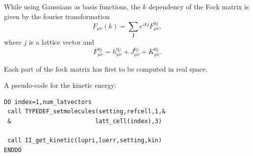 \documentclass[12pt,a4paper,english]{beamer}
\newcommand{\mbf}{ \mathbf }
\newcommand{\braopket}[3]{\langle #1|#2|#3\rangle}
\begin{document}
\begin{frame}

  While using Gaussians as basis functions, the $k$ dependency of the Fock matrix is given by the fourier transformation
  \begin{equation}
	F_{\mu\nu}(k)=\sum_{\mbf j}e^{ikj}F_{\mu\nu}^{0j},
	   \label{hfbleq:totmatx2}
	 \end{equation}
	 where $j$ is a lattice vector and
	 \begin{equation}
	   F_{\mu\nu}^{0j}=h_{\mu\nu}^{0j}+J_{\mu\nu}^{0j}+K_{\mu\nu}^{0j}.
	 \end{equation}

	 Each part of the fock matrix has first to be computed in real space.

\end{frame}
\begin{frame}[fragile]

  A pseudo-code for the kinetic energy:

\begin{lstlisting}
DO index=1,num_latvectors
 call TYPEDEF_setmolecules(setting,refcell,1,&
 &                        latt_cell(index),3)

 call II_get_kinetic(lupri,luerr,setting,kin)
ENDDO
\end{lstlisting}
  
  



\end{frame}
\end{document}
